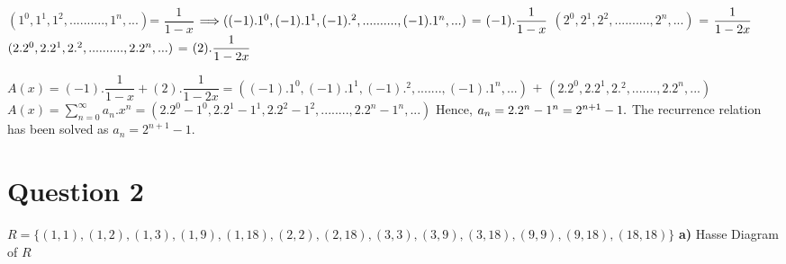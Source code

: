 \documentclass[11pt]{article}
\begin{document}
$(1^0,1^1,1^2,..........,1^n,...)$\space = \space $\dfrac{1}{1-x}$ \space \space \space $\space \space \space \Longrightarrow \space \space ((-1).1^0,(-1).1^1,(-1).^2,..........,(-1).1^n,...)$ \space = \space  $\space (-1).\dfrac{1}{1-x}$ \newline \newline
$(2^0,2^1,2^2,..........,2^n,...)$ \space \space = \space $\dfrac{1}{1-2x}  \space \space$\space \Longrightarrow \space  $\space \space(2.2^0,2.2^1,2.^2,..........,2.2^n,...)$ = $(2)\space.\space\dfrac{1}{1-2x}$ \newline

\noindent $A(x) = (-1).\dfrac{1}{1-x} + (2).\dfrac{1}{1-2x} = ((-1).1^0,(-1).1^1,(-1).^2,.......,(-1).1^n,...)$ \space + \space$(2.2^0,2.2^1,2.^2,.......,2.2^n,...)$ \newline \newline
$A(x) = \sum\limits^{\infty}_{n=0}{a_n.x^n} = (2.2^0 - 1^0,2.2^1 - 1^1,2.2^2 - 1^2,........,2.2^n - 1^n,...)$ \newline \newline
Hence, $a_n = 2.2^n - 1^n = 2^{n+1} - 1. \newline \newline \newline \newline $
\noindent
The recurrence relation has been solved as \textbf{$a_n = 2^{n+1} - 1$}.


\newpage
\section*{Question 2}
$R = \{(1,1),(1,2),(1,3),(1,9),(1,18),(2,2),(2,18),(3,3),(3,9),(3,18),(9,9),(9,18),(18,18)\}$ \newline \newline
\textbf{a)} Hasse Diagram of $R$ \newline \newline
\end{document}
